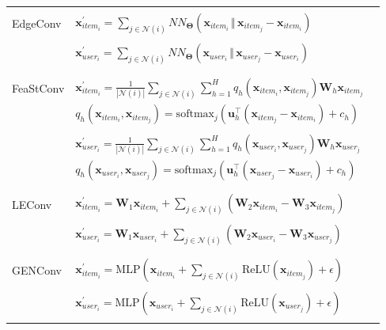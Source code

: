 \documentclass{scrartcl}
\begin{document}
\begin{appendices}
\begin{longtable}{|l|l|l|}
    \rowcolor[gray]{0.9} & \\
    \rowcolor[gray]{0.9} EdgeConv & $\mathbf{x}^{\prime}_{item_{i}} = \sum_{j \in \mathcal{N}(i)} NN_{\mathbf{\Theta}}(\mathbf{x}_{item_{i}} \, \Vert \, \mathbf{x}_{item_{j}} - \mathbf{x}_{item_{i}})$ \\
    \rowcolor[gray]{0.9} & \\
    \rowcolor[gray]{0.9} & $\mathbf{x}^{\prime}_{user_{i}} = \sum_{j \in \mathcal{N}(i)} NN_{\mathbf{\Theta}}(\mathbf{x}_{user_{i}} \, \Vert \, \mathbf{x}_{user_{j}} - \mathbf{x}_{user_{i}})$ \\
    \rowcolor[gray]{0.9} & \\

     & \\
    FeaStConv & $\mathbf{x}^{\prime}_{item_{i}} = \frac{1}{|\mathcal{N}(i)|} \sum_{j \in \mathcal{N}(i)} \sum_{h=1}^H
    q_h(\mathbf{x}_{item_{i}}, \mathbf{x}_{item_{j}}) \mathbf{W}_h \mathbf{x}_{item_{j}}$ \\
    & $q_h(\mathbf{x}_{item_{i}}, \mathbf{x}_{item_{j}}) = \mathrm{softmax}_{j}
    (\mathbf{u}_h^{\top} (\mathbf{x}_{item_{j}} - \mathbf{x}_{item_{i}}) + c_h)$ \\
     & \\
    &  $\mathbf{x}^{\prime}_{user_{i}} = \frac{1}{|\mathcal{N}(i)|} \sum_{j \in \mathcal{N}(i)} \sum_{h=1}^H
    q_h(\mathbf{x}_{user_{i}}, \mathbf{x}_{user_{j}}) \mathbf{W}_h \mathbf{x}_{user_{j}}$ \\
    & $q_h(\mathbf{x}_{user_{i}}, \mathbf{x}_{user_{j}}) = \mathrm{softmax}_j
    (\mathbf{u}_h^{\top} (\mathbf{x}_{user_{j}} - \mathbf{x}_{user_{i}}) + c_h)$ \\
     & \\

    \rowcolor[gray]{0.9} & \\
    \rowcolor[gray]{0.9} LEConv & $\mathbf{x}^{\prime}_{item_{i}} =  \mathbf{W}_1 \mathbf{x}_{item_{i}}+
    \sum_{j \in \mathcal{N}(i)}
    (\mathbf{W}_2 \mathbf{x}_{item_{i}} - \mathbf{W}_3 \mathbf{x}_{item_{j}})$ \\
    \rowcolor[gray]{0.9} & \\
    \rowcolor[gray]{0.9} & $\mathbf{x}^{\prime}_{user_{i}} = \mathbf{W}_1 \mathbf{x}_{user_{i}}+
    \sum_{j \in \mathcal{N}(i)}
    (\mathbf{W}_2 \mathbf{x}_{user_{i}} - \mathbf{W}_3 \mathbf{x}_{user_{j}})$ \\
    \rowcolor[gray]{0.9} & \\

     & \\
    GENConv & $\mathbf{x}_{item_{i}}^{\prime} = \mathrm{MLP} \left( \mathbf{x}_{item_{i}} +
    \sum_{j \in \mathcal{N}(i)} 
    \mathrm{ReLU} \left( \mathbf{x}_{item_{j}} \right) +\epsilon \right)$ \\
     & \\
     & $\mathbf{x}_{user_{i}}^{\prime} = \mathrm{MLP} \left( \mathbf{x}_{user_{i}} +
    \sum_{j \in \mathcal{N}(i)} 
    \mathrm{ReLU} \left( \mathbf{x}_{user_{j}} \right) +\epsilon \right)$ \\
     & \\


\end{longtable}
\end{appendices}
\end{document}
